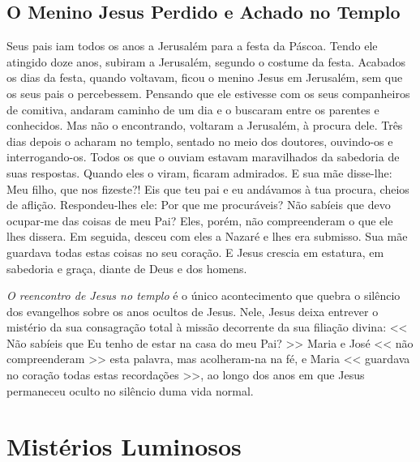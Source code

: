 \documentclass{rosario}
\begin{document}

\section{O Menino Jesus Perdido e Achado no Templo}




Seus pais iam todos os anos a Jerusalém para a festa da Páscoa.
Tendo ele atingido doze anos, subiram a Jerusalém, segundo o costume da festa.
Acabados os dias da festa, quando voltavam, ficou o menino Jesus em Jerusalém, sem que os seus pais o percebessem.
Pensando que ele estivesse com os seus companheiros de comitiva, andaram caminho de um dia e o buscaram entre os parentes e conhecidos.
Mas não o encontrando, voltaram a Jerusalém, à procura dele.
Três dias depois o acharam no templo, sentado no meio dos doutores, ouvindo-os e interrogando-os.
Todos os que o ouviam estavam maravilhados da sabedoria de suas respostas.
Quando eles o viram, ficaram admirados.
E sua mãe disse-lhe:
Meu filho, que nos fizeste?! Eis que teu pai e eu andávamos à tua procura, cheios de aflição.
Respondeu-lhes ele:
Por que me procuráveis? Não sabíeis que devo ocupar-me das coisas de meu Pai?
Eles, porém, não compreenderam o que ele lhes dissera.
Em seguida, desceu com eles a Nazaré e lhes era submisso.
Sua mãe guardava todas estas coisas no seu coração.
E Jesus crescia em estatura, em sabedoria e graça, diante de Deus e dos homens.



\emph{O reencontro de Jesus no templo} é o único acontecimento que quebra o silêncio dos evangelhos sobre os anos ocultos de Jesus.
Nele, Jesus deixa entrever o mistério da sua consagração total à missão decorrente da sua filiação divina:
<< Não sabíeis que Eu tenho de estar na casa do meu Pai? >>
Maria e José << não compreenderam >> esta palavra, mas acolheram-na na fé, e Maria << guardava no coração todas estas recordações >>, ao longo dos anos em que Jesus permaneceu oculto no silêncio duma vida normal.


\chapter{Mistérios Luminosos}
\end{document}

